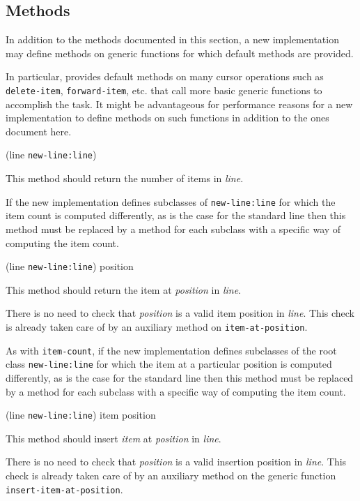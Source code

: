 \subsection{Methods}

In addition to the methods documented in this section, a new
implementation may define methods on generic functions for which
default methods are provided.

In particular, \sysname{} provides default methods on many cursor
operations such as \texttt{delete-item}, \texttt{forward-item},
etc. that call more basic generic functions to accomplish the task.
It might be advantageous for performance reasons for a new
implementation to define methods on such functions in addition to the
ones document here.

 {(line \texttt{new-line:line})}

This method should return the number of items in \textit{line}.

If the new implementation defines subclasses of \texttt{new-line:line}
for which the item count is computed differently, as is the case for
the standard line  then this
method must be replaced by a method for each subclass with a specific
way of computing the item count.

 {(line \texttt{new-line:line}) position}

This method should return the item at \textit{position} in \textit{line}.

There is no need to check that \textit{position} is a valid item
position in \textit{line}.  This check is already taken care of by an
auxiliary method on \texttt{item-at-position}.

As with \texttt{item-count}, if the new implementation defines
subclasses of the root class \texttt{new-line:line} for which the item
at a particular position is computed differently, as is the case for
the standard line  then this
method must be replaced by a method for each subclass with a specific
way of computing the item count.

 {(line \texttt{new-line:line}) item position}

This method should insert \textit{item} at \textit{position} in
\textit{line}.

There is no need to check that \textit{position} is a valid insertion
position in \textit{line}.  This check is already taken care of by an
auxiliary method on the generic function
\texttt{insert-item-at-position}.

